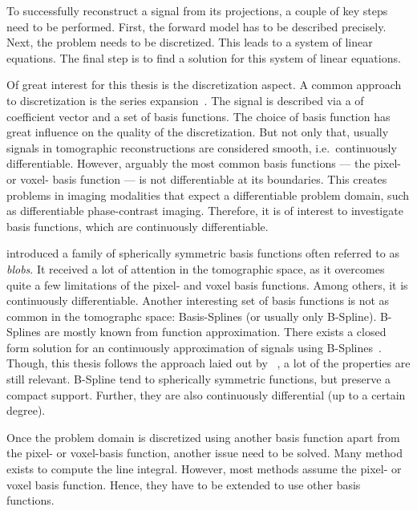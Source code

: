 To successfully reconstruct a signal from its projections, a couple of key steps need to be
performed. First, the forward model has to be described precisely. Next, the problem needs to be
discretized. This leads to a system of linear equations. The final step is to find a solution for
this system of linear equations.

Of great interest for this thesis is the discretization aspect. A common approach to discretization
is the series expansion~\cite{herman_basis_2015}. The signal is described via a of coefficient
vector and a set of basis functions. The choice of basis function has great influence on the quality
of the discretization. But not only that, usually signals in tomographic reconstructions are
considered smooth, i.e.\ continuously differentiable. However, arguably the most common basis
functions --- the pixel- or voxel- basis function --- is not differentiable at its boundaries. This
creates problems in imaging modalities that expect a differentiable problem domain, such as
differentiable phase-contrast imaging. Therefore, it is of interest to investigate basis functions,
which are continuously differentiable.

\citeauthor*{lewitt_multidimensional_1990} introduced a family of spherically symmetric basis
functions often referred to as \textit{blobs}. It received a lot of attention in the tomographic
space, as it overcomes quite a few limitations of the pixel- and voxel basis functions. Among
others, it is continuously differentiable. Another interesting set of basis functions is not as
common in the tomographc space: Basis-Splines (or usually only B-Spline). B-Splines are mostly known
from function approximation. There exists a closed form solution for an continuously approximation
of signals using B-Splines~\cite{unser_fast_1991}. Though, this thesis follows the approach laied out
by \citeauthor*{momey_new_2011}~\cite{momey_new_2011,momey_b-spline_2012, momey_spline_2015}, a lot
of the properties are still relevant. B-Spline tend to spherically symmetric functions, but preserve
a compact support. Further, they are also continuously differential (up to a certain degree).

Once the problem domain is discretized using another basis function apart from the pixel- or
voxel-basis function, another issue need to be solved. Many method exists to compute the line
integral. However, most methods assume the pixel- or voxel basis function. Hence, they have to be
extended to use other basis functions.

